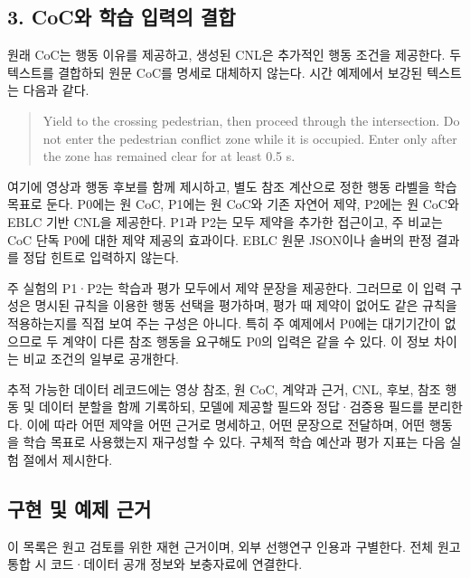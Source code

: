 \documentclass[11pt,a4paper]{article}
\begin{document}
\subsection*{3. CoC와 학습 입력의 결합}

원래 CoC는 행동 이유를 제공하고, 생성된 CNL은 추가적인 행동 조건을 제공한다. 두 텍스트를 결합하되 원문 CoC를 명세로 대체하지 않는다. 시간 예제에서 보강된 텍스트는 다음과 같다.\par

\begin{quote}Yield to the crossing pedestrian, then proceed through the intersection. Do not enter the pedestrian conflict zone while it is occupied. Enter only after the zone has remained clear for at least 0.5 s.\end{quote}

여기에 영상과 행동 후보를 함께 제시하고, 별도 참조 계산으로 정한 행동 라벨을 학습 목표로 둔다. P0에는 원 CoC, P1에는 원 CoC와 기존 자연어 제약, P2에는 원 CoC와 EBLC 기반 CNL을 제공한다. P1과 P2는 모두 제약을 추가한 접근이고, 주 비교는 CoC 단독 P0에 대한 제약 제공의 효과이다. EBLC 원문 JSON이나 솔버의 판정 결과를 정답 힌트로 입력하지 않는다.\par

주 실험의 P1·P2는 학습과 평가 모두에서 제약 문장을 제공한다. 그러므로 이 입력 구성은 명시된 규칙을 이용한 행동 선택을 평가하며, 평가 때 제약이 없어도 같은 규칙을 적용하는지를 직접 보여 주는 구성은 아니다. 특히 주 예제에서 P0에는 대기기간이 없으므로 두 계약이 다른 참조 행동을 요구해도 P0의 입력은 같을 수 있다. 이 정보 차이는 비교 조건의 일부로 공개한다.\par

추적 가능한 데이터 레코드에는 영상 참조, 원 CoC, 계약과 근거, CNL, 후보, 참조 행동 및 데이터 분할을 함께 기록하되, 모델에 제공할 필드와 정답·검증용 필드를 분리한다. 이에 따라 어떤 제약을 어떤 근거로 명세하고, 어떤 문장으로 전달하며, 어떤 행동을 학습 목표로 사용했는지 재구성할 수 있다. 구체적 학습 예산과 평가 지표는 다음 실험 절에서 제시한다.\par

\begingroup\small\setlength{\parskip}{3pt}
\subsection*{구현 및 예제 근거}

이 목록은 원고 검토를 위한 재현 근거이며, 외부 선행연구 인용과 구별한다. 전체 원고 통합 시 코드·데이터 공개 정보와 보충자료에 연결한다.\par
\end{document}
